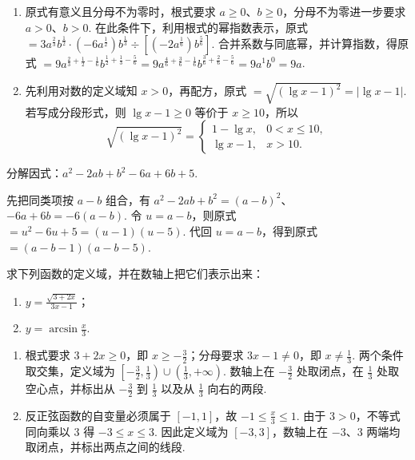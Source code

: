 \begin{solution}
\begin{enumerate}
    \item 原式有意义且分母不为零时，根式要求 \(a\geqslant0\)、\(b\geqslant0\)，分母不为零进一步要求 \(a>0\)、\(b>0\). 在此条件下，利用根式的幂指数表示，原式 \(=3a^{\frac{2}{3}}b^{\frac{1}{2}}\cdot(-6a^{\frac{1}{2}})b^{\frac{1}{3}}\div\left[(-2a^{\frac{1}{6}})b^{\frac{5}{6}}\right]\). 合并系数与同底幂，并计算指数，得原式 \(=9a^{\frac{2}{3}+\frac{1}{2}-\frac{1}{6}}b^{\frac{1}{2}+\frac{1}{3}-\frac{5}{6}}=9a^{\frac{4}{6}+\frac{3}{6}-\frac{1}{6}}b^{\frac{3}{6}+\frac{2}{6}-\frac{5}{6}}=9a^1b^0=9a\).

    \item 先利用对数的定义域知 \(x>0\)，再配方，原式 \(=\sqrt{(\lg x-1)^2}=|\lg x-1|\). 若写成分段形式，则 \(\lg x-1\geqslant0\) 等价于 \(x\geqslant10\)，所以
    \[
    \sqrt{(\lg x-1)^2}=\begin{cases}
    1-\lg x,&0<x\leqslant10,\\
    \lg x-1,&x>10.
    \end{cases}
    \]
\end{enumerate}
\end{solution}

\begin{problem}
分解因式：\(a^2-2ab+b^2-6a+6b+5\).
\end{problem}

\begin{solution}
先把同类项按 \(a-b\) 组合，有 \(a^2-2ab+b^2=(a-b)^2\)、\(-6a+6b=-6(a-b)\). 令 \(u=a-b\)，则原式 \(=u^2-6u+5=(u-1)(u-5)\). 代回 \(u=a-b\)，得到原式 \(=(a-b-1)(a-b-5)\).
\end{solution}

\begin{problem}
求下列函数的定义域，并在数轴上把它们表示出来：

\begin{enumerate}
    \item \(y=\frac{\sqrt{3+2x}}{3x-1}\)；
    \item \(y=\arcsin\frac{x}{3}\).
\end{enumerate}
\end{problem}

\begin{solution}
\begin{enumerate}
    \item 根式要求 \(3+2x\geqslant0\)，即 \(x\geqslant-\frac32\)；分母要求 \(3x-1\neq0\)，即 \(x\neq\frac13\). 两个条件取交集，定义域为 \(\left[-\frac32,\frac13\right)\cup\left(\frac13,+\infty\right)\). 数轴上在 \(-\frac32\) 处取闭点，在 \(\frac13\) 处取空心点，并标出从 \(-\frac32\) 到 \(\frac13\) 以及从 \(\frac13\) 向右的两段.

    \item 反正弦函数的自变量必须属于 \([-1,1]\)，故 \(-1\leqslant\frac{x}{3}\leqslant1\). 由于 \(3>0\)，不等式同向乘以 \(3\) 得 \(-3\leqslant x\leqslant3\). 因此定义域为 \([-3,3]\)，数轴上在 \(-3\)、\(3\) 两端均取闭点，并标出两点之间的线段.
\end{enumerate}
\end{solution}

